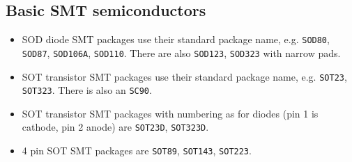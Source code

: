 \documentclass{article}
\begin{document}
\subsection{Basic SMT semiconductors}
\begin{itemize}
\item   SOD diode SMT packages use their standard package name, e.g.
	{\tt SOD80}, {\tt SOD87}, {\tt SOD106A}, {\tt SOD110}. There are 
	also {\tt SOD123}, {\tt SOD323} with narrow pads.

\item   SOT transistor SMT packages use their standard package name,
	e.g. {\tt SOT23}, {\tt SOT323}. There is also an {\tt SC90}.

\item   SOT transistor SMT packages with numbering as for diodes (pin 1
	is cathode, pin 2 anode) are {\tt SOT23D}, {\tt SOT323D}.

\item   4 pin SOT SMT packages are {\tt SOT89}, {\tt SOT143}, {\tt SOT223}.
\end{itemize}
\end{document}

